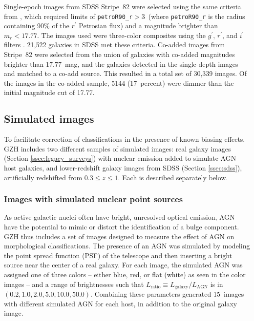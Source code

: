 \documentclass[twocolumn]{aastex6}
\begin{document}
Single-epoch images from SDSS Stripe~82 were selected using the same criteria
from \citet{wil13}, which required limits of \texttt{petroR90\_r}$ >
3$\arcsec~(where \texttt{petroR90\_r} is the radius containing 90\% of the
$r^\prime$ Petrosian flux) and a magnitude brighter than $m_r < 17.77$. The
images used were three-color composites using the $g^\prime$, $r^\prime$, and
$i^\prime$ filters \citep{nie04}. 21,522 galaxies in SDSS met these criteria.
Co-added images from Stripe~82 were selected from the union of galaxies with
co-added magnitudes brighter than $17.77$~mag, and the galaxies detected in the
single-depth images and matched to a co-add source. This resulted in a total
set of 30,339 images. Of the images in the co-added sample, 5144 (17~percent)
were dimmer than the initial magnitude cut of 17.77. 


\subsection{Simulated \hst{} images}\label{ssec:simulatedimages}

To facilitate correction of classifications in the presence of known biasing
effects, GZH includes two different samples of simulated \hst{} images: real
\hst{} galaxy images (Section \ref{ssec:legacy_surveys}) with nuclear emission
added to simulate AGN host galaxies, and lower-redshift galaxy images from SDSS
(Section \ref{ssec:sdss}), artificially redshifted from $0.3 \leq z \leq 1$.
Each is described separately below. 

\subsubsection{Images with simulated nuclear point sources}\label{ssec:sim_agn}

As active galactic nuclei often have bright, unresolved optical emission, AGN
have the potential to mimic or distort the identification of a bulge component.
GZH thus includes a set of images designed to measure the effect of AGN on
morphological classifications.  The presence of an AGN was simulated by
modeling the point spread function (PSF) of the telescope and then inserting a
bright source near the center of a real galaxy. For each image, the simulated
AGN was assigned one of three colors -- either blue, red, or flat (white) as
seen in the color images -- and a range of brightnesses such that
$L_\mathrm{ratio} \equiv L_\mathrm{galaxy}/L_\mathrm{AGN}$ is in
$(0.2,1.0,2.0,5.0,10.0,50.0)$. Combining these parameters generated 15~images
with different simulated AGN for each host, in addition to the original galaxy
image. 
\end{document}
